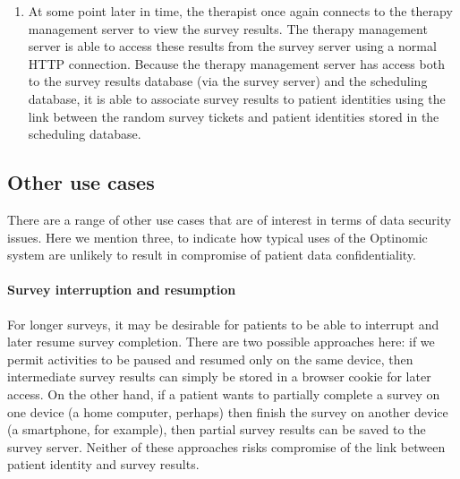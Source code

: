 \documentclass[DIV=calc,paper=a4,fontsize=11pt,twocolumn]{scrartcl}
\begin{document}
\begin{enumerate}
{    results can be associated with patient identities\footnote{The
      only exception to this statement is (obviously) if the module
      directly requests patient identifying information as part of a
      survey.}.  Once the survey results are saved, the survey server
    sends a message to the therapy management server to indicate that
    the survey has been completed.  Note that this message is the
    \emph{only} instance where communication is required to cross the
    clinic firewall in an incoming direction.  As such, survey
    completion messages are transmitted from the survey server to the
    therapy management server using a custom channel over a single IP
    port opened in the clinic firewall, rather than via a normal HTTP
    connection.  When the therapy management server receives this
    message from the survey server, it updates the scheduling database
    to indicate that the patient has completed the assigned activity
    (at this point, the management server could also send alerts to
    the therapist, trigger follow-on activities for the patient, and
    so on).}
  \item{At some point later in time, the therapist once again connects
    to the therapy management server to view the survey results.  The
    therapy management server is able to access these results from the
    survey server using a normal HTTP connection.  Because the therapy
    management server has access both to the survey results database
    (via the survey server) and the scheduling database, it is able to
    associate survey results to patient identities using the link
    between the random survey tickets and patient identities stored in
    the scheduling database.}
\end{enumerate}


\subsection*{Other use cases}

There are a range of other use cases that are of interest in terms of
data security issues.  Here we mention three, to indicate how typical
uses of the Optinomic system are unlikely to result in compromise of
patient data confidentiality.

\paragraph{Survey interruption and resumption}

For longer surveys, it may be desirable for patients to be able to
interrupt and later resume survey completion.  There are two possible
approaches here: if we permit activities to be paused and resumed only
on the same device, then intermediate survey results can simply be
stored in a browser cookie for later access.  On the other hand, if a
patient wants to partially complete a survey on one device (a home
computer, perhaps) then finish the survey on another device (a
smartphone, for example), then partial survey results can be saved to
the survey server.  Neither of these approaches risks compromise of
the link between patient identity and survey results.
\end{document}
